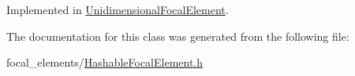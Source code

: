 Implemented in \hyperlink{classUnidimensionalFocalElement_a073ce6e51cb7fff32b53e5f7b1d729c7}{Unidimensional\+Focal\+Element}.



The documentation for this class was generated from the following file\+:\begin{DoxyCompactItemize}
\item 
focal\+\_\+elements/\hyperlink{HashableFocalElement_8h}{Hashable\+Focal\+Element.\+h}\end{DoxyCompactItemize}
